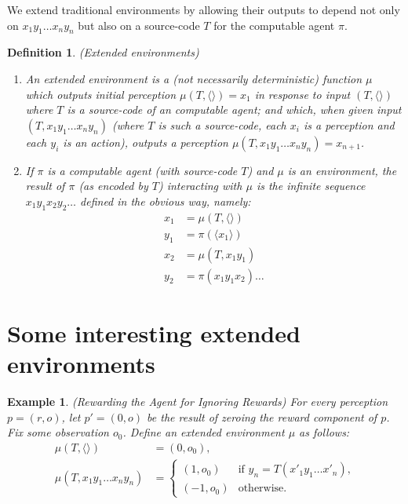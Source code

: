 \documentclass{article}
\newtheorem{myexample}[mytheorem]{Example}
\newtheorem{mydefinition}[mytheorem]{Definition}
\begin{document}
We extend traditional environments by allowing their outputs to depend not only on
$x_1y_1\ldots x_ny_n$ but also on a source-code $T$ for the computable agent $\pi$.

\begin{mydefinition}
\label{extendedenvironmentsdefn}
(Extended environments)
\begin{enumerate}
  \item
  An \emph{extended environment} is a (not necessarily deterministic)
  function $\mu$ which outputs initial perception $\mu(T,\langle\rangle)=x_1$
  in response to input $(T,\langle\rangle)$ where $T$ is a source-code of an
  computable agent; and which, when given input $(T,x_1y_1\ldots x_ny_n)$ (where
  $T$ is such a source-code, each $x_i$ is a perception and each $y_i$ is
  an action), outputs a perception $\mu(T,x_1y_1\ldots x_ny_n)=x_{n+1}$.
  \item
  If $\pi$ is a computable agent (with source-code $T$)
  and $\mu$ is an environment, the \emph{result of $\pi$ (as encoded by $T$)
  interacting with $\mu$} is the infinite sequence $x_1y_1x_2y_2\ldots$ defined in
  the obvious way, namely:
  \begin{align*}
    x_1 &= \mu(T,\langle\rangle)\\
    y_1 &= \pi(\langle x_1\rangle)\\
    x_2 &= \mu(T,x_1y_1)\\
    y_2 &= \pi(x_1y_1x_2) \ldots
  \end{align*}
\end{enumerate}
\end{mydefinition}

\section{Some interesting extended environments}

\begin{myexample}
\label{rewardagentforignoringrewardsexample}
  (Rewarding the Agent for Ignoring Rewards)
  For every perception $p=(r,o)$, let $p'=(0,o)$ be the result of zeroing the
  reward component of $p$.
  Fix some observation $o_0$.
  Define an extended environment $\mu$ as follows:
  \begin{align*}
    \mu(T,\langle\rangle) &= (0,o_0),\\
    \mu(T,x_1y_1\ldots x_ny_n) &=
      \begin{cases}
        (1,o_0) & \mbox{if $y_n=T(x'_1y_1\ldots x'_n)$,}\\
        (-1,o_0) & \mbox{otherwise.}
      \end{cases}
  \end{align*}
\end{myexample}
\end{document}
